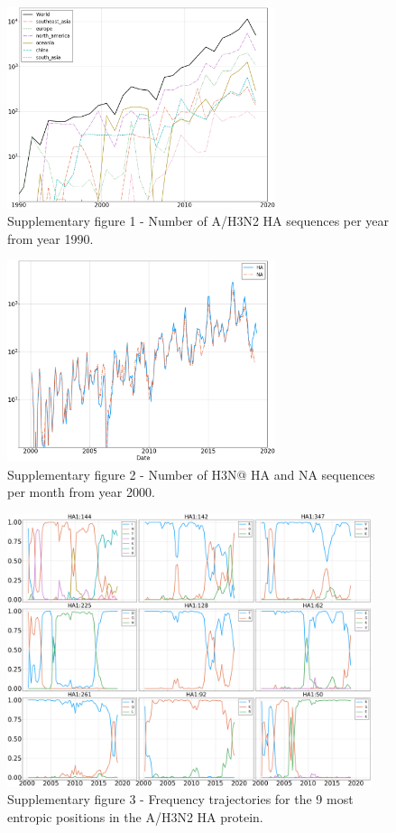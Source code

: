 \documentclass[reprint,amsmath,amssymb,superscriptaddress,showpacs,pre]{revtex4-1}
\begin{document}
	\begin{figure}[h]
		\centering
		\includegraphics[width=0.7\textwidth]{SM_figures/Nseq_per_year.png}
		\caption{Supplementary figure 1 - Number of A/H3N2 HA sequences per year from year 1990. }
		\label{fig:nseq_per_year}
	\end{figure}
	\begin{figure}[h]
		\centering
		\includegraphics[width=0.7\textwidth]{SM_figures/Nseq_per_month.png}
		\caption{Supplementary figure 2 - Number of H3N@ HA and NA sequences per month from year 2000. }
		\label{fig:nseq_per_month}
	\end{figure}

	\begin{figure}[h]
		\centering
		\includegraphics[width=0.95\textwidth]{SM_figures/sample_trajectories.png}
		\caption{Supplementary figure 3 - Frequency trajectories for the 9 most entropic positions in the A/H3N2 HA protein.}
		\label{fig:sample_trajectories}
	\end{figure}
\end{document}
